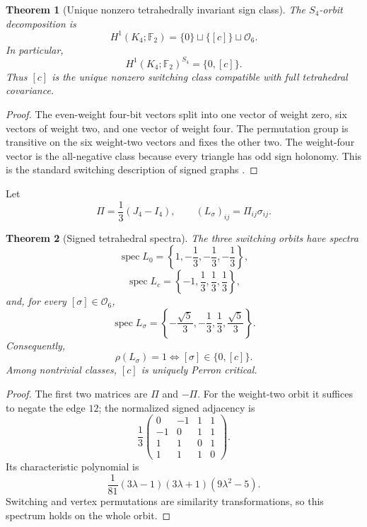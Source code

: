 \documentclass[11pt,oneside,openany]{book}
\numberwithin{equation}{chapter}
\newtheorem{theorem}{Theorem}[chapter]
\theoremstyle{definition}
\theoremstyle{remark}
\newcommand{\spec}{\operatorname{spec}}
\newcommand{\Ftwo}{\mathbb F_2}
\begin{document}
\begin{theorem}[Unique nonzero tetrahedrally invariant sign class]
\label{thm:unique-antibalanced-class}
The \(S_4\)-orbit decomposition is
\[
 \boxed{
 H^1(K_4;\Ftwo)
 =\{0\}\sqcup\{[c]\}\sqcup\mathcal O_6.}
\]
In particular,
\[
 \boxed{
 H^1(K_4;\Ftwo)^{S_4}=\{0,[c]\}.}
\]
Thus \([c]\) is the unique nonzero switching class compatible with full
tetrahedral covariance.
\end{theorem}

\begin{proof}
The even-weight four-bit vectors split into one vector of weight zero, six
vectors of weight two, and one vector of weight four.  The permutation group
is transitive on the six weight-two vectors and fixes the other two.  The
weight-four vector is the all-negative class because every triangle has odd
sign holonomy.  This is the standard switching description of signed graphs
\cite{Zaslavsky1982}.
\end{proof}

Let
\[
 \Pi=\frac13(J_4-I_4),
 \qquad
 (L_\sigma)_{ij}=\Pi_{ij}\sigma_{ij}.
\]

\begin{theorem}[Signed tetrahedral spectra]
\label{thm:signed-tetrahedral-spectra}
The three switching orbits have spectra
\[
 \spec L_0
 =\left\{1,-\frac13,-\frac13,-\frac13\right\},
\]
\[
 \spec L_c
 =\left\{-1,\frac13,\frac13,\frac13\right\},
\]
and, for every \([\sigma]\in\mathcal O_6\),
\[
 \spec L_\sigma
 =\left\{-\frac{\sqrt5}{3},-\frac13,
          \frac13,\frac{\sqrt5}{3}\right\}.
\]
Consequently,
\[
 \boxed{
 \rho(L_\sigma)=1
 \iff
 [\sigma]\in\{0,[c]\}.}
\]
Among nontrivial classes, \([c]\) is uniquely Perron critical.
\end{theorem}

\begin{proof}
The first two matrices are \(\Pi\) and \(-\Pi\).  For the weight-two orbit it
suffices to negate the edge \(12\); the normalized signed adjacency is
\[
 \frac13
 \begin{pmatrix}
 0&-1&1&1\\
 -1&0&1&1\\
 1&1&0&1\\
 1&1&1&0
 \end{pmatrix}.
\]
Its characteristic polynomial is
\[
 \frac1{81}(3\lambda-1)(3\lambda+1)(9\lambda^2-5).
\]
Switching and vertex permutations are similarity transformations, so this
spectrum holds on the whole orbit.
\end{proof}
\end{document}
